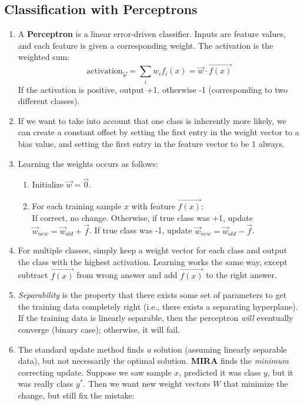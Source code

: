\documentclass[10pt]{article}
\begin{document}
\begin{multicols}{2}
\begin{addmargin}[0.8em]{0.5em}
    \subsection{Classification with Perceptrons}
    \begin{enumerate}[label=(\alph*)]
        \item A \textbf{Perceptron} is a linear error-driven classifier. Inputs are feature values, and each feature is given a corresponding weight. The activation is the weighted sum: $$\text{activation}_{\vec{w}}=\sum_{i}w_if_i(x)=\vec{w} \cdot \vec{f(x)}$$ 
        If the activation is positive, output +1, otherwise -1 (corresponding to two different classes).
        \item If we want to take into account that one class is inherently more likely, we can create a constant offset by setting the first entry in the weight vector to a bias value, and setting the first entry in the feature vector to be 1 always.
        \item Learning the weights occurs as follows:
        \begin{enumerate}
            \item Initialize $\vec{w}=\vec{0}$.
            \item For each training sample $x$ with feature $\vec{f(x)}$: \\ If correct, no change. Otherwise, if true class was +1, update $\vec{w}_{new} = \vec{w}_{old}+\vec{f}$. If true class was -1, update $\vec{w}_{new} = \vec{w}_{old}-\vec{f}$.
        \end{enumerate}
        \item For multiple classes, simply keep a weight vector for each class and output the class with the highest activation. Learning works the same way, except subtract $\vec{f(x)}$ from wrong answer and add $\vec{f(x)}$ to the right answer. 
        \item \textit{Separability} is the property that there exists some set of parameters to get the training data completely right (i.e., there exists a separating hyperplane). If the training data is linearly separable, then the perceptron \textit{will} eventually converge (binary case); otherwise, it will fail.
        \item The standard update method finds \textit{a} solution (assuming linearly separable data), but not necessarily the optimal solution. \textbf{MIRA} finds the \textit{minimum} correcting update. Suppose we saw sample $x$, predicted it was class $y$, but it was really class $y^*$. Then we want new weight vectors $W$ that minimize the change, but still fix the mistake: 

\end{enumerate}
\end{addmargin}
\end{multicols}
\end{document}
